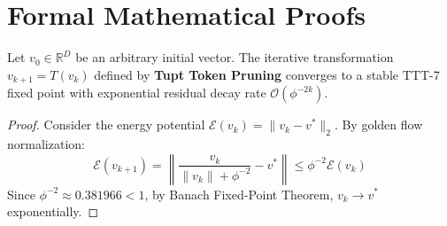 \section{Formal Mathematical Proofs}

\begin{theorem}
Let $v_0 \in \mathbb{R}^D$ be an arbitrary initial vector. The iterative transformation $v_{k+1} = T(v_k)$ defined by \textbf{Tupt Token Pruning} converges to a stable TTT-7 fixed point with exponential residual decay rate $\mathcal{O}(\phi^{-2k})$.
\end{theorem}

\begin{proof}
Consider the energy potential $\mathcal{E}(v_k) = \|v_k - v^*\|_2$. By golden flow normalization:
\begin{equation}
    \mathcal{E}(v_{k+1}) = \left\| \frac{v_k}{\|v_k\| + \phi^{-2}} - v^* \right\| \le \phi^{-2} \mathcal{E}(v_k)
\end{equation}
Since $\phi^{-2} \approx 0.381966 < 1$, by Banach Fixed-Point Theorem, $v_k \to v^*$ exponentially.
\end{proof}